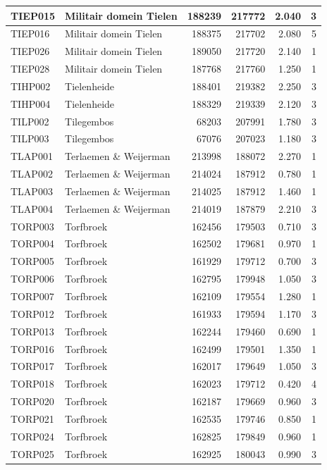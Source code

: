 \documentclass[11pt,]{book}
\begin{document}
\begin{table}
\begin{tabular}[t]{l|l|r|r|r|r}
\hline
TIEP015 & Militair domein Tielen & 188239 & 217772 & 2.040 & 3\\
\hline
TIEP016 & Militair domein Tielen & 188375 & 217702 & 2.080 & 5\\
\hline
TIEP026 & Militair domein Tielen & 189050 & 217720 & 2.140 & 1\\
\hline
TIEP028 & Militair domein Tielen & 187768 & 217760 & 1.250 & 1\\
\hline
TIHP002 & Tielenheide & 188401 & 219382 & 2.250 & 3\\
\hline
TIHP004 & Tielenheide & 188329 & 219339 & 2.120 & 3\\
\hline
TILP002 & Tilegembos & 68203 & 207991 & 1.780 & 3\\
\hline
TILP003 & Tilegembos & 67076 & 207023 & 1.180 & 3\\
\hline
TLAP001 & Terlaemen \& Weijerman & 213998 & 188072 & 2.270 & 1\\
\hline
TLAP002 & Terlaemen \& Weijerman & 214024 & 187912 & 0.780 & 1\\
\hline
TLAP003 & Terlaemen \& Weijerman & 214025 & 187912 & 1.460 & 1\\
\hline
TLAP004 & Terlaemen \& Weijerman & 214019 & 187879 & 2.210 & 3\\
\hline
TORP003 & Torfbroek & 162456 & 179503 & 0.710 & 3\\
\hline
TORP004 & Torfbroek & 162502 & 179681 & 0.970 & 1\\
\hline
TORP005 & Torfbroek & 161929 & 179712 & 0.700 & 3\\
\hline
TORP006 & Torfbroek & 162795 & 179948 & 1.050 & 3\\
\hline
TORP007 & Torfbroek & 162109 & 179554 & 1.280 & 1\\
\hline
TORP012 & Torfbroek & 161933 & 179594 & 1.170 & 3\\
\hline
TORP013 & Torfbroek & 162244 & 179460 & 0.690 & 1\\
\hline
TORP016 & Torfbroek & 162499 & 179501 & 1.350 & 1\\
\hline
TORP017 & Torfbroek & 162017 & 179649 & 1.050 & 3\\
\hline
TORP018 & Torfbroek & 162023 & 179712 & 0.420 & 4\\
\hline
TORP020 & Torfbroek & 162187 & 179669 & 0.960 & 3\\
\hline
TORP021 & Torfbroek & 162535 & 179746 & 0.850 & 1\\
\hline
TORP024 & Torfbroek & 162825 & 179849 & 0.960 & 1\\
\hline
TORP025 & Torfbroek & 162925 & 180043 & 0.990 & 3\\

\end{tabular}
\end{table}
\end{document}
